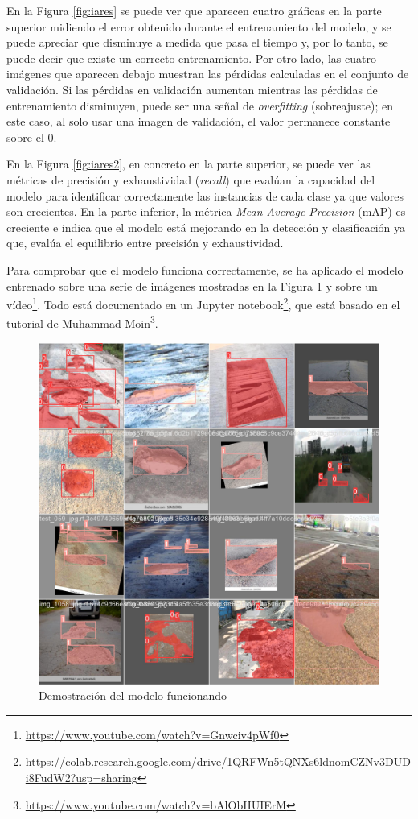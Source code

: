 En la Figura \ref{fig:iares} se puede ver que aparecen cuatro gráficas en la parte superior midiendo el error obtenido durante el entrenamiento del modelo, y se puede apreciar que disminuye a medida que pasa el tiempo y, por lo tanto, se puede decir que existe un correcto entrenamiento. Por otro lado, las cuatro imágenes que aparecen debajo muestran las pérdidas calculadas en el conjunto de validación. Si las pérdidas en validación aumentan mientras las pérdidas de entrenamiento disminuyen, puede ser una señal de \textit{overfitting} (sobreajuste); en este caso, al solo usar una imagen de validación, el valor permanece constante sobre el 0.

En la Figura \ref{fig:iares2}, en concreto en la parte superior, se puede ver las métricas de precisión y exhaustividad (\textit{recall}) que evalúan la capacidad del modelo para identificar correctamente las instancias de cada clase ya que valores son crecientes. En la parte inferior, la métrica \textit{Mean Average Precision} (mAP) es creciente e indica que el modelo está mejorando en la detección y clasificación ya que, evalúa el equilibrio entre precisión y exhaustividad.

Para comprobar que el modelo funciona correctamente, se ha aplicado el modelo entrenado sobre una serie de imágenes mostradas en la Figura \ref{fig:trainex} y sobre un vídeo\footnote{\url{https://www.youtube.com/watch?v=Gnwciv4pWf0}}. Todo está documentado en un Jupyter notebook\footnote{\url{https://colab.research.google.com/drive/1QRFWn5tQNXs6ldnomCZNv3DUDi8FudW2?usp=sharing}}, que está basado en el tutorial de Muhammad Moin\footnote{\url{https://www.youtube.com/watch?v=bAlObHUIErM}}.

 \begin{figure} [h!]
	\begin{center}
		\includegraphics[width=13cm]{figs/cap6/train_results.jpg}
	\end{center}
	\caption{Demostración del modelo funcionando}
	\label{fig:trainex}
\end{figure}

